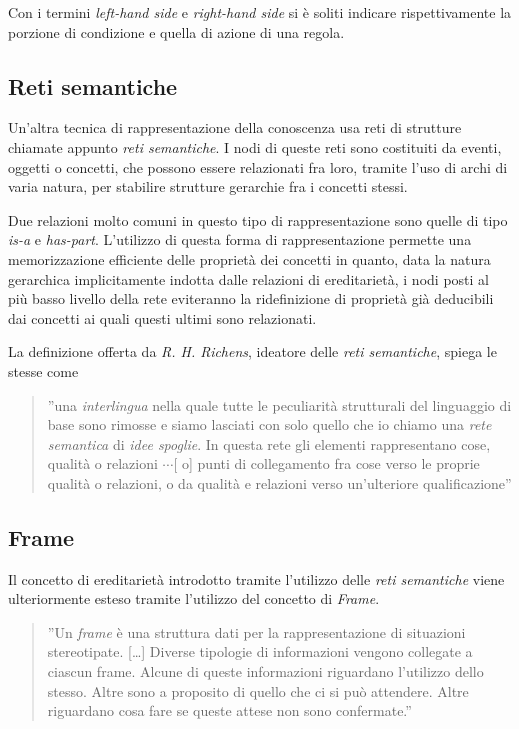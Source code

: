 Con i termini \emph{left-hand side} e \emph{right-hand side} si è soliti indicare rispettivamente la porzione di condizione e quella di azione di una regola.

\subsection{Reti semantiche}
Un'altra tecnica di rappresentazione della conoscenza usa reti di strutture chiamate appunto \emph{reti semantiche}. I nodi di queste reti sono costituiti da eventi, oggetti o concetti, che possono essere relazionati fra loro, tramite l'uso di archi di varia natura, per stabilire strutture gerarchie fra i concetti stessi. \cite{development1993}

Due relazioni molto comuni in questo tipo di rappresentazione sono quelle di tipo \emph{is-a} e \emph{has-part}. L'utilizzo di questa forma di rappresentazione permette una memorizzazione efficiente delle proprietà dei concetti in quanto, data la natura gerarchica implicitamente indotta dalle relazioni di ereditarietà, i nodi posti al più basso livello della rete eviteranno la ridefinizione di proprietà già deducibili dai concetti ai quali questi ultimi sono relazionati.

La definizione offerta da \emph{R. H. Richens}, ideatore delle \emph{reti semantiche}, spiega le stesse come
\begin{quote}
''una \emph{interlingua} nella quale tutte le peculiarità strutturali del linguaggio di base sono rimosse e siamo lasciati con solo quello che io chiamo una \emph{rete semantica} di \emph{idee spoglie}. In questa rete gli elementi rappresentano cose, qualità o relazioni $\cdots$[ o] punti di collegamento fra cose verso le proprie qualità o relazioni, o da qualità e relazioni verso un'ulteriore qualificazione''\cite{richens1956}
\end{quote}

\subsection{Frame}
Il concetto di ereditarietà introdotto tramite l'utilizzo delle \emph{reti semantiche} viene ulteriormente esteso tramite l'utilizzo del concetto di \emph{Frame}. 
\begin{quote}
''Un \emph{frame} è una struttura dati per la rappresentazione di situazioni stereotipate. [\dots] Diverse tipologie di informazioni vengono collegate a ciascun frame. Alcune di queste informazioni riguardano l'utilizzo dello stesso. Altre sono a proposito di quello che ci si può attendere. Altre riguardano cosa fare se queste attese non sono confermate.'' \cite{minsky1974}
\end{quote}


